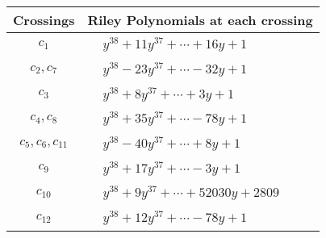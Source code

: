 \documentclass[1p]{elsarticle_modified}
\theoremstyle{definition}
\begin{document}
\begin{tabular}{m{50pt}|m{274pt}}
Crossings & \hspace{64pt}Riley Polynomials at each crossing \\
\hline $$\begin{aligned}c_{1}\end{aligned}$$&$\begin{aligned}
&y^{38}+11 y^{37}+\cdots+16 y+1
\end{aligned}$\\
\hline $$\begin{aligned}c_{2},c_{7}\end{aligned}$$&$\begin{aligned}
&y^{38}-23 y^{37}+\cdots-32 y+1
\end{aligned}$\\
\hline $$\begin{aligned}c_{3}\end{aligned}$$&$\begin{aligned}
&y^{38}+8 y^{37}+\cdots+3 y+1
\end{aligned}$\\
\hline $$\begin{aligned}c_{4},c_{8}\end{aligned}$$&$\begin{aligned}
&y^{38}+35 y^{37}+\cdots-78 y+1
\end{aligned}$\\
\hline $$\begin{aligned}c_{5},c_{6},c_{11}\end{aligned}$$&$\begin{aligned}
&y^{38}-40 y^{37}+\cdots+8 y+1
\end{aligned}$\\
\hline $$\begin{aligned}c_{9}\end{aligned}$$&$\begin{aligned}
&y^{38}+17 y^{37}+\cdots-3 y+1
\end{aligned}$\\
\hline $$\begin{aligned}c_{10}\end{aligned}$$&$\begin{aligned}
&y^{38}+9 y^{37}+\cdots+52030 y+2809
\end{aligned}$\\
\hline $$\begin{aligned}c_{12}\end{aligned}$$&$\begin{aligned}
&y^{38}+12 y^{37}+\cdots-78 y+1
\end{aligned}$\\
\hline
\end{tabular}\\~\\
\end{document}
